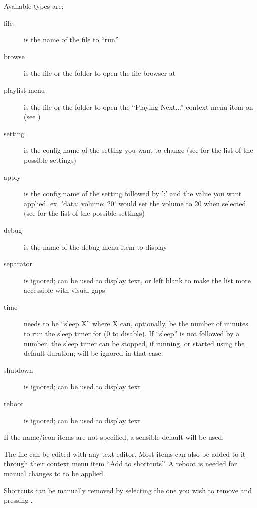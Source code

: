 Available types are:
\begin{description}
\item[file]  is the name of the file to ``run''
\item[browse]  is the file or the folder to open the file browser at
\item[playlist menu]  is the file or the folder to open the
  ``Playing Next...'' context menu item on (see )
\item[setting]  is the config name of the setting you want to change
  (see  for the list of the possible settings)
\item[apply]  is the config name of the setting followed by ':' 
  and the value you want applied. ex. 'data: volume: 20' would set the volume to 20 when selected
  (see  for the list of the possible settings)
\item[debug]  is the name of the debug menu item to display
\item[separator]  is ignored;  can be used to display text,
  or left blank to make the list more accessible with visual gaps
\item[time]  needs to be ``sleep X''
  where X can, optionally, be the number of minutes to run the sleep timer for (0 to disable).
  If ``sleep'' is not followed by a number, the sleep timer can be stopped, if running,
  or started using the default duration;  will be ignored in that case.
\item[shutdown]  is ignored;  can be used to display text
\item[reboot]  is ignored;  can be used to display text
\end{description}

If the name/icon items are not specified, a sensible default will be used.


The file  can be edited with any text editor. Most items can
also be added to it through their context menu item ``Add to shortcuts''.
A reboot is needed for manual changes to  to be applied.

Shortcuts can be manually removed by selecting the one you wish to remove and pressing
\ActionStdContext{}.
